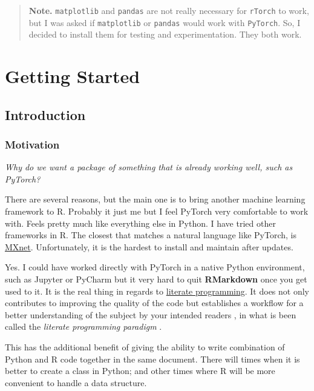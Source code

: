 \documentclass[]{book}
\begin{document}
\begin{quote}
\textbf{Note.} \texttt{matplotlib} and \texttt{pandas} are not really necessary for \texttt{rTorch} to work, but I was asked if \texttt{matplotlib} or \texttt{pandas} would work with \texttt{PyTorch}. So, I decided to install them for testing and experimentation. They both work.
\end{quote}

\hypertarget{part-getting-started}{%
\part{Getting Started}\label{part-getting-started}}

\hypertarget{intro}{%
\chapter{Introduction}\label{intro}}

\hypertarget{motivation}{%
\section{Motivation}\label{motivation}}

\emph{Why do we want a package of something that is already working well, such as PyTorch?}

There are several reasons, but the main one is to bring another machine learning framework to R. Probably it just me but I feel PyTorch very comfortable to work with. Feels pretty much like everything else in Python. I have tried other frameworks in R. The closest that matches a natural language like PyTorch, is \href{}{MXnet}. Unfortunately, it is the hardest to install and maintain after updates.

Yes. I could have worked directly with PyTorch in a native Python environment, such as Jupyter or PyCharm but it very hard to quit \textbf{RMarkdown} once you get used to it. It is the real thing in regards to \href{https://en.wikipedia.org/wiki/Literate_programming}{literate programming}. It does not only contributes to improving the quality of the code but establishes a workflow for a better understanding of the subject by your intended readers \citep{knuth1983}, in what is been called the \emph{literate programming paradigm} \citep{cordes1991}.

This has the additional benefit of giving the ability to write combination of Python and R code together in the same document. There will times when it is better to create a class in Python; and other times where R will be more convenient to handle a data structure.
\end{document}

